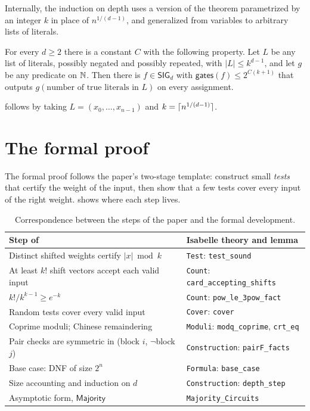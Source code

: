 \documentclass[11pt]{article}
\newcommand{\isa}[1]{\texttt{#1}}
\newcommand{\sig}{\mathsf{SIG}}
\newcommand{\gates}{\mathsf{gates}}
\newcommand{\Majority}{\mathsf{Majority}}
\begin{document}
Internally, the induction on depth uses a version of the theorem parametrized by an integer $k$ in place of $n^{1/(d-1)}$, and generalized from variables to arbitrary lists of literals.

\begin{theorem}[\isa{symmetric\_upper\_bound}]\label{thm:internal}
For every $d \ge 2$ there is a constant $C$ with the following property. Let $L$ be any list of literals, possibly negated and possibly repeated, with $|L| \le k^{d-1}$, and let $g$ be any predicate on $\mathbb{N}$. Then there is $f \in \sig_d$ with $\gates(f) \le 2^{C(k+1)}$ that outputs $g(\text{number of true literals in } L)$ on every assignment.
\end{theorem}

 follows by taking $L = (x_0, \dots, x_{n-1})$ and $k = \lceil n^{1/(d-1)}\rceil$.

\section{The formal proof}
\label{sec:proof}

The formal proof follows the paper's two-stage template: construct small \emph{tests} that certify the weight of the input, then show that a few tests cover every input of the right weight.  shows where each step lives.

\begin{table}[htbp]
\centering
\small
\begin{tabular}{@{}p{}p{}@{}}
\toprule
Step of \citet{LR26} & Isabelle theory and lemma \\
\midrule
Distinct shifted weights certify $|x| \bmod k$ & \isa{Test}: \isa{test\_sound} \\
At least $k!$ shift vectors accept each valid input & \isa{Count}: \isa{card\_accepting\_shifts} \\
$k!/k^{k-1} \ge e^{-k}$ & \isa{Count}: \isa{pow\_le\_3pow\_fact} \\
Random tests cover every valid input & \isa{Cover}: \isa{cover} \\
Coprime moduli; Chinese remaindering & \isa{Moduli}: \isa{modq\_coprime}, \isa{crt\_eq} \\
Pair checks are symmetric in (block $i$, $\neg$block $j$) & \isa{Construction}: \isa{pairF\_facts} \\
Base case: DNF of size $2^n$ & \isa{Formula}: \isa{base\_case} \\
Size accounting and induction on $d$ & \isa{Construction}: \isa{depth\_step} \\
Asymptotic form, $\Majority$ & \isa{Majority\_Circuits} \\
\bottomrule
\end{tabular}
\caption{Correspondence between the steps of the paper and the formal development.}
\label{tab:map}
\end{table}
\end{document}
